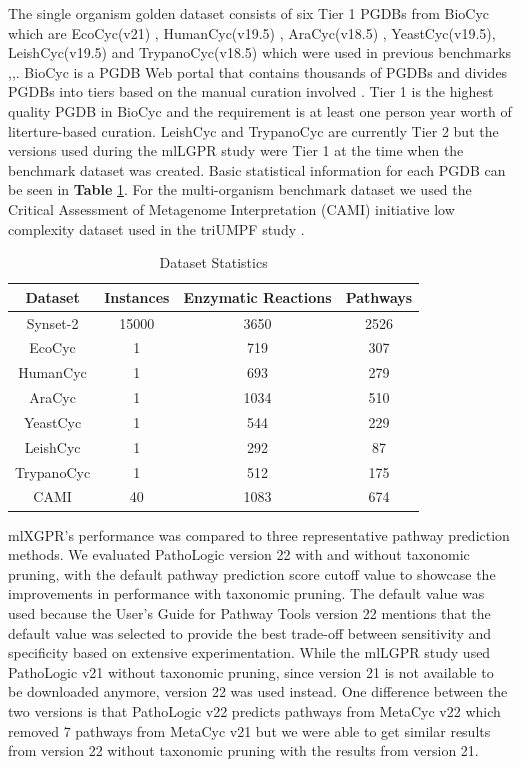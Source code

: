 \documentclass[sn-mathphys,Numbered]{sn-jnl}%
\theoremstyle{thmstyleone}%
\theoremstyle{thmstyletwo}%
\theoremstyle{thmstylethree}%
\begin{document}
The single organism golden dataset consists of six Tier 1 PGDBs from BioCyc which are EcoCyc(v21) \cite{keselerEcoCycDatabase20212021}, HumanCyc(v19.5) \cite{romeroComputationalPredictionHuman2004}, AraCyc(v18.5) \cite{muellerAraCycBiochemicalPathway2003}, YeastCyc(v19.5), LeishCyc(v19.5) \cite{doyleLeishCycBiochemicalPathways2009} and TrypanoCyc(v18.5) \cite{shameerTrypanoCycCommunityledBiochemical2015} which were used in previous benchmarks \cite{m.a.basherMetabolicPathwayInference2020},\cite{mabasherLeveragingHeterogeneousNetwork2021},\cite{basherMetabolicPathwayPrediction2021}.
BioCyc is a PGDB Web portal that contains thousands of PGDBs and divides PGDBs into tiers based on the manual curation involved \cite{karpBioCycCollectionMicrobial2019}.
Tier 1 is the highest quality PGDB in BioCyc and the requirement is at least one person year worth of literture-based curation.
LeishCyc and TrypanoCyc are currently Tier 2 but the versions used during the mlLGPR study were Tier 1 at the time when the benchmark dataset was created.
Basic statistical information for each PGDB can be seen in \textbf{Table} \ref{table:3}.
For the multi-organism benchmark dataset we used the Critical Assessment of Metagenome Interpretation (CAMI) initiative low complexity dataset \cite{sczyrbaCriticalAssessmentMetagenome2017} used in the triUMPF study \cite{basherMetabolicPathwayPrediction2021}.

\begin{table}[hb]
\caption{Dataset Statistics}
\label{table:3}
\begin{tabular}{c| c c c}
 \hline
 \textbf{Dataset}&\textbf{Instances}&\textbf{Enzymatic Reactions}&\textbf{Pathways}\\ %
 \hline
 Synset-2&15000&3650&2526\\
 EcoCyc&1&719&307\\
 HumanCyc&1&693&279\\
 AraCyc&1&1034&510\\
 YeastCyc&1&544&229\\
 LeishCyc&1&292&87\\
 TrypanoCyc&1&512&175\\
 CAMI&40&1083&674\\
 \hline
\end{tabular}
\end{table}

mlXGPR's performance was compared to three representative pathway prediction methods. 
We evaluated PathoLogic version 22 with and without taxonomic pruning, with the default pathway prediction score cutoff value to showcase the improvements in performance with taxonomic pruning.
The default value was used because the User's Guide for Pathway Tools version 22 mentions that the default value was selected to provide the best trade-off between sensitivity and specificity based on extensive experimentation. %
While the mlLGPR study used PathoLogic v21 without taxonomic pruning, since version 21 is not available to be downloaded anymore, version 22 was used instead.
One difference between the two versions is that PathoLogic v22 predicts pathways from MetaCyc v22 which removed 7 pathways from MetaCyc v21 but we were able to get similar results from version 22 without taxonomic pruning with the results from version 21.
\end{document}
